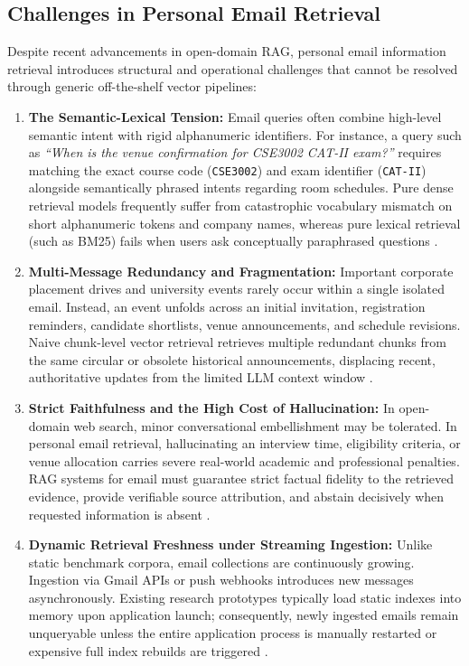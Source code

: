 \documentclass[11pt,a4paper]{article}
\begin{document}
\subsection{Challenges in Personal Email Retrieval}
Despite recent advancements in open-domain RAG, personal email information retrieval introduces structural and operational challenges that cannot be resolved through generic off-the-shelf vector pipelines:
\begin{enumerate}
    \item \textbf{The Semantic-Lexical Tension:} Email queries often combine high-level semantic intent with rigid alphanumeric identifiers. For instance, a query such as \textit{``When is the venue confirmation for CSE3002 CAT-II exam?''} requires matching the exact course code (\texttt{CSE3002}) and exam identifier (\texttt{CAT-II}) alongside semantically phrased intents regarding room schedules. Pure dense retrieval models frequently suffer from catastrophic vocabulary mismatch on short alphanumeric tokens and company names, whereas pure lexical retrieval (such as BM25) fails when users ask conceptually paraphrased questions \cite{karpukhin2020dense, robertson2009probabilistic}.
    \item \textbf{Multi-Message Redundancy and Fragmentation:} Important corporate placement drives and university events rarely occur within a single isolated email. Instead, an event unfolds across an initial invitation, registration reminders, candidate shortlists, venue announcements, and schedule revisions. Naive chunk-level vector retrieval retrieves multiple redundant chunks from the same circular or obsolete historical announcements, displacing recent, authoritative updates from the limited LLM context window \cite{zhang2021emailsum}.
    \item \textbf{Strict Faithfulness and the High Cost of Hallucination:} In open-domain web search, minor conversational embellishment may be tolerated. In personal email retrieval, hallucinating an interview time, eligibility criteria, or venue allocation carries severe real-world academic and professional penalties. RAG systems for email must guarantee strict factual fidelity to the retrieved evidence, provide verifiable source attribution, and abstain decisively when requested information is absent \cite{gao2023enabling, min2023factscore, ji2023survey, chen2024controlling}.
    \item \textbf{Dynamic Retrieval Freshness under Streaming Ingestion:} Unlike static benchmark corpora, email collections are continuously growing. Ingestion via Gmail APIs or push webhooks introduces new messages asynchronously. Existing research prototypes typically load static indexes into memory upon application launch; consequently, newly ingested emails remain unqueryable unless the entire application process is manually restarted or expensive full index rebuilds are triggered \cite{busch2012earlybird, zhang2023incremental}.
\end{enumerate}
\end{document}
